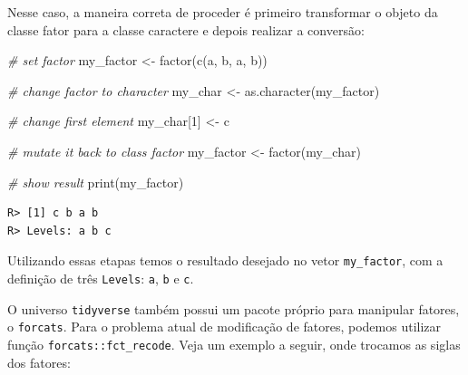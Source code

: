 \documentclass[
  11pt,
]{book}
\newenvironment{Shaded}{\begin{snugshade}}{\end{snugshade}}
\newcommand{\CommentTok}[1]{\textcolor[rgb]{0.37,0.37,0.37}{\textit{#1}}}
\newcommand{\DecValTok}[1]{\textcolor[rgb]{0.06,0.06,0.06}{#1}}
\newcommand{\FunctionTok}[1]{\textcolor[rgb]{0,0,0}{#1}}
\newcommand{\NormalTok}[1]{#1}
\newcommand{\OtherTok}[1]{\textcolor[rgb]{0.37,0.37,0.37}{#1}}
\newcommand{\StringTok}[1]{\textcolor[rgb]{0.5,0.5,0.5}{#1}}
\begin{document}
Nesse caso, a maneira correta de proceder é primeiro transformar o objeto da classe fator para a classe caractere e depois realizar a conversão:

\begin{Shaded}
\begin{Highlighting}[]
\CommentTok{\# set factor}
\NormalTok{my\_factor }\OtherTok{\textless{}{-}} \FunctionTok{factor}\NormalTok{(}\FunctionTok{c}\NormalTok{(}\StringTok{\textquotesingle{}a\textquotesingle{}}\NormalTok{, }\StringTok{\textquotesingle{}b\textquotesingle{}}\NormalTok{, }\StringTok{\textquotesingle{}a\textquotesingle{}}\NormalTok{, }\StringTok{\textquotesingle{}b\textquotesingle{}}\NormalTok{))}

\CommentTok{\# change factor to character}
\NormalTok{my\_char }\OtherTok{\textless{}{-}} \FunctionTok{as.character}\NormalTok{(my\_factor)}

\CommentTok{\# change first element}
\NormalTok{my\_char[}\DecValTok{1}\NormalTok{] }\OtherTok{\textless{}{-}} \StringTok{\textquotesingle{}c\textquotesingle{}}

\CommentTok{\# mutate it back to class factor}
\NormalTok{my\_factor }\OtherTok{\textless{}{-}} \FunctionTok{factor}\NormalTok{(my\_char)}

\CommentTok{\# show result}
\FunctionTok{print}\NormalTok{(my\_factor)}
\end{Highlighting}
\end{Shaded}

\begin{verbatim}
R> [1] c b a b
R> Levels: a b c
\end{verbatim}

Utilizando essas etapas temos o resultado desejado no vetor \texttt{my\_factor}, com a definição de três \texttt{Levels}: \texttt{a}, \texttt{b} e \texttt{c}.

O universo \texttt{tidyverse} também possui um pacote próprio para manipular fatores, o \texttt{forcats}. Para o problema atual de modificação de fatores, podemos utilizar função \texttt{forcats::fct\_recode}. Veja um exemplo a seguir, onde trocamos as siglas dos fatores: 
\end{document}
